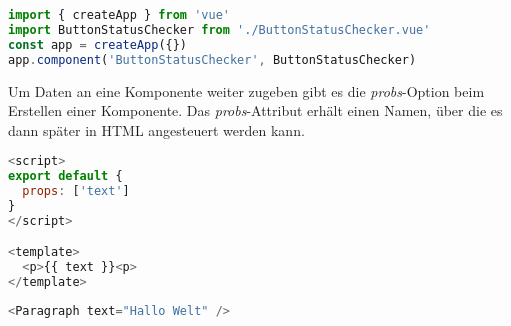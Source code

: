 \newpage

\begin{lstlisting}[caption={Globale Registrierung einer Komponente},language=javascript,label={lst:Globale Registrierung}]
import { createApp } from 'vue'
import ButtonStatusChecker from './ButtonStatusChecker.vue'
const app = createApp({})
app.component('ButtonStatusChecker', ButtonStatusChecker)
\end{lstlisting}


Um Daten an eine Komponente weiter zugeben gibt es die \emph{probs}-Option beim Erstellen einer Komponente.
Das \emph{probs}-Attribut erhält einen Namen, über die es dann später in
HTML angesteuert werden kann. \cite{vueComponents}

\begin{lstlisting}[caption={Erstellung eines \emph{probs}},language=javascript,label={lst:Erstellung eines probs}]
<script>
export default {
  props: ['text']
}
</script>

<template>
  <p>{{ text }}<p>
</template>
\end{lstlisting}

\begin{lstlisting}[caption={Nutzung eines \emph{probs}},language=javascript,label={lst:Nutzung eines probs}]
<Paragraph text="Hallo Welt" />
\end{lstlisting}

